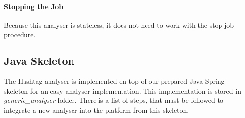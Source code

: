 \paragraph{Stopping the Job}

Because this analyser is stateless, it does not need to work with the stop job procedure.

\subsection{Java Skeleton}\label{section:custom_ds}

The Hashtag analyser is implemented on  top of our prepared Java Spring skeleton for an easy analyser implementation. This implementation is stored in \textit{generic\_analyser} folder. There is a list of steps, that must be followed to integrate a new analyser into the platform from this skeleton.


